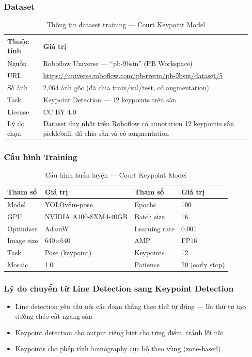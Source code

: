 \documentclass[12pt,a4paper]{article}
\begin{document}
\subsubsection{Dataset}
\begin{table}[H]
\centering
\caption{Thông tin dataset training --- Court Keypoint Model}
\label{tab:dataset_court}
\begin{tabularx}{\textwidth}{l X}
\toprule
\textbf{Thuộc tính} & \textbf{Giá trị} \\
\midrule
Nguồn & Roboflow Universe --- ``pb-9bsin'' (PB Workspace) \\
URL & \url{https://universe.roboflow.com/pb-rrerm/pb-9bsin/dataset/5} \\
Số ảnh & 2,064 ảnh gốc (đã chia train/val/test, có augmentation) \\
Task & Keypoint Detection --- 12 keypoints trên sân \\
License & CC BY 4.0 \\
Lý do chọn & Dataset duy nhất trên Roboflow có annotation 12 keypoints sân pickleball, đã chia sẵn và có augmentation \\
\bottomrule
\end{tabularx}
\end{table}

\subsubsection{Cấu hình Training}
\begin{table}[H]
\centering
\caption{Cấu hình huấn luyện --- Court Keypoint Model}
\label{tab:training_court}
\begin{tabular}{ll|ll}
\toprule
\textbf{Tham số} & \textbf{Giá trị} & \textbf{Tham số} & \textbf{Giá trị} \\
\midrule
Model & YOLOv8m-pose & Epochs & 100 \\
GPU & NVIDIA A100-SXM4-40GB & Batch size & 16 \\
Optimizer & AdamW & Learning rate & 0.001 \\
Image size & 640$\times$640 & AMP & FP16 \\
Task & Pose (keypoint) & Keypoints & 12 \\
Mosaic & 1.0 & Patience & 20 (early stop) \\
\bottomrule
\end{tabular}
\end{table}

\subsubsection{Lý do chuyển từ Line Detection sang Keypoint Detection}
\begin{itemize}[noitemsep]
    \item Line detection yêu cầu nối các đoạn thẳng theo thứ tự đúng --- lỗi thứ tự tạo đường chéo cắt ngang sân
    \item Keypoint detection cho output riêng biệt cho từng điểm, tránh lỗi nối
    \item Keypoints cho phép tính homography cục bộ theo vùng (zone-based)
\end{itemize}
\end{document}
